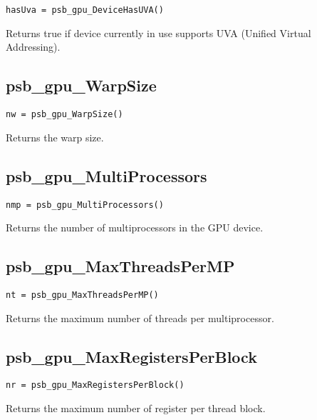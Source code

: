 \begin{verbatim}
hasUva = psb_gpu_DeviceHasUVA()
\end{verbatim}

Returns true if device currently in use supports UVA (Unified Virtual Addressing).

\subsection*{psb\_gpu\_WarpSize }

\begin{verbatim}
nw = psb_gpu_WarpSize()
\end{verbatim}

Returns the warp size.


\subsection*{psb\_gpu\_MultiProcessors }

\begin{verbatim}
nmp = psb_gpu_MultiProcessors()
\end{verbatim}

Returns the number of multiprocessors in the GPU device.

\subsection*{psb\_gpu\_MaxThreadsPerMP }

\begin{verbatim}
nt = psb_gpu_MaxThreadsPerMP()
\end{verbatim}

Returns the maximum number of threads per multiprocessor. 


\subsection*{psb\_gpu\_MaxRegistersPerBlock }

\begin{verbatim}
nr = psb_gpu_MaxRegistersPerBlock()
\end{verbatim}

Returns the maximum number of register per thread block. 


